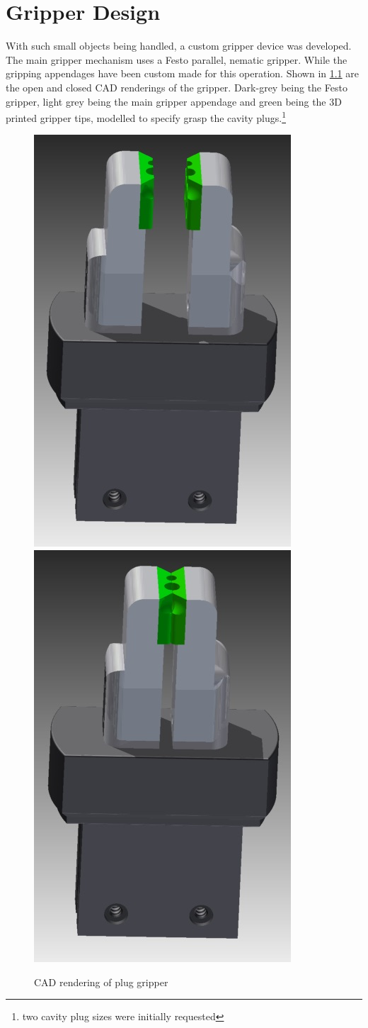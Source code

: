 \documentclass[11pt,a4paper]{report}
\begin{document}
\chapter{Gripper Design}
With such small objects being handled, a custom gripper device was developed. The main gripper mechanism uses a Festo parallel, nematic gripper. While the gripping appendages have been custom made for this operation. Shown in \cref{fig:gripper2} are the open and closed CAD renderings of the gripper. Dark-grey being the Festo gripper, light grey being the main gripper appendage and green being the 3D printed gripper tips, modelled to specify grasp the cavity plugs.\footnote{two cavity plug sizes were initially requested}

\begin{figure}[h]
\centering
\includegraphics[width=0.4\linewidth]{gripper2}\ %
\includegraphics[width=0.4\linewidth]{gripper1}
\caption{CAD rendering of plug gripper}
\label{fig:gripper2}
\end{figure}
\end{document}

